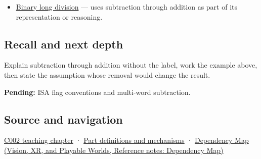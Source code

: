 \hypertarget{appendix-1c7df340573e-used-by}{}

\begin{itemize}
\tightlist
\item
  \hyperref[appendix-89985e6a2685]{Binary long division} --- uses subtraction through addition as part of its representation or reasoning.
\end{itemize}

\subsection{Recall and next depth}\label{appendix-1c7df340573e-recall-and-next-depth}

\hypertarget{appendix-1c7df340573e-recall-and-next-depth}{}

Explain subtraction through addition without the label, work the example above, then state the assumption whose removal would change the result.

\textbf{Pending:} ISA flag conventions and multi-word subtraction.

\subsection{Source and navigation}\label{appendix-1c7df340573e-source-and-navigation}

\hypertarget{appendix-1c7df340573e-source-and-navigation}{}

\hyperref[01-foundations-i-ch001-arithmetic-becomes-a-policy]{C002 teaching chapter} · \hyperref[appendix-fd090d982a15]{Part definitions and mechanisms} · \href{../07-Vision-XR-and-Playable-Worlds/main.pdf\#nameddest=appendix-4ad47bdd269a}{Dependency Map (Vision, XR, and Playable Worlds, Reference notes: Dependency Map)}

